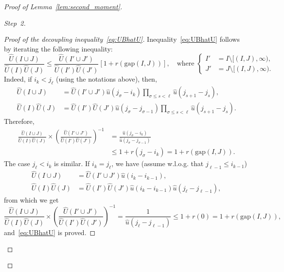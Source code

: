 \documentclass[11pt]{article}
\theoremstyle{definition}
\numberwithin{equation}{section}
\numberwithin{figure}{section}
\numberwithin{table}{section}
\newcommand{\hu}{\hat u}
\newcommand{\hU}{\hat U}
\newcommand{\gap}{{\mathrm{gap}}}
\newenvironment{step}[1]{\begin{proof}[#1]}{\let\qed\relax \end{proof}}
\begin{document}
\begin{proof}[Proof of Lemma~\ref{lem:second_moment}]
\begin{step}{Step~2}
\begin{proof}[Proof of the decoupling inequality~\eqref{eq:UBhatU}]
Inequality~\eqref{eq:UBhatU} follows by iterating the following inequality:
\begin{equation}
\frac{\hU(I \cup J)}{\hU(I) \hU(J)} \leq \frac{\hU(I' \cup J')}{\hU(I') \hU(J')}[1 + r(\gap(I,J))], \quad \text{where }\left\{
\begin{aligned}
I'&= I \setminus [(I,J),\infty),\\
J'&= J \setminus [(I,J),\infty).
\end{aligned}
\right.
\end{equation}
Indeed, if $i_k < j_\ell$ (using the notations above), then,
\begin{equation}
\begin{aligned}
\hU(I \cup J) &= \hU(I' \cup J') \hu(j_\sigma - i_k) \prod_{\sigma \leq s < \ell} \hu(j_{s+1}-j_s),\\
\hU(I)\hU(J) &= \hU(I')\hU(J') \hu(j_\sigma - j_{\sigma-1}) \prod_{\sigma \leq s < \ell} \hu(j_{s+1}-j_s).
\end{aligned}
\end{equation}
Therefore,
\begin{equation}
\begin{aligned}
\frac{\hU(I \cup J)}{\hU(I) \hU(J)} \times \left(\frac{\hU(I' \cup J')}{\hU(I') \hU(J')} \right)^{-1} &= \frac{\hu(j_\sigma - i_k)}{\hu(j_\sigma - j_{\sigma-1})}\\
& \leq 1 + r(j_\sigma - i_k) = 1 + r(\gap(I,J)).
\end{aligned}
\end{equation}
The case $j_\ell < i_k$ is similar. If $i_k = j_\ell$, we have (assume w.l.o.g. that $j_{\ell-1} \leq i_{k-1}$)
\begin{equation}
\begin{aligned}
\hU(I \cup J) &= \hU(I' \cup J') \hu(i_k - i_{k-1}),\\
\hU(I) \hU(J) &= \hU(I') \hU(J') \hu(i_k - i_{k-1}) \hu(j_\ell - j_{\ell-1}),
\end{aligned}
\end{equation}
from which we get
\begin{equation}
\frac{\hU(I \cup J)}{\hU(I) \hU(J)} \times \left(\frac{\hU(I' \cup J')}{\hU(I') \hU(J')} \right)^{-1} = \frac{1}{\hu(j_\ell - j_{\ell-1})} \leq 1 + r(0) = 1 + r(\gap(I,J)),
\end{equation}
and~\eqref{eq:UBhatU} is proved.
\end{proof}
\end{step}


\end{proof}
\end{document}
